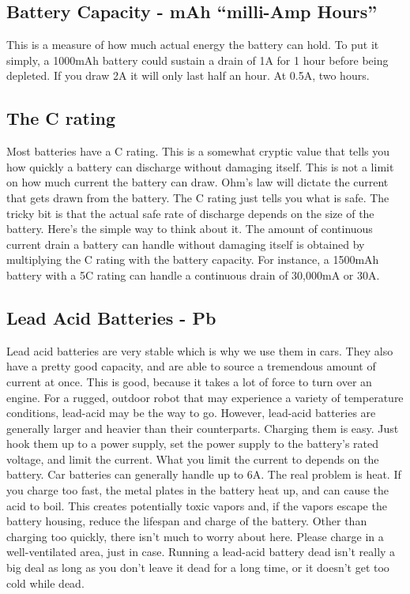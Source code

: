 \hypertarget{battery-capacity---mah-milli-amp-hours}{%
\subsection{Battery Capacity - mAh ``milli-Amp
Hours''}\label{battery-capacity---mah-milli-amp-hours}}

This is a measure of how much actual energy the battery can hold. To put
it simply, a 1000mAh battery could sustain a drain of 1A for 1 hour
before being depleted. If you draw 2A it will only last half an hour. At
0.5A, two hours.

\hypertarget{the-c-rating}{%
\subsection{The C rating}\label{the-c-rating}}

Most batteries have a C rating. This is a somewhat cryptic value that
tells you how quickly a battery can discharge without damaging itself.
This is not a limit on how much current the battery can draw. Ohm's law
will dictate the current that gets drawn from the battery. The C rating
just tells you what is safe. The tricky bit is that the actual safe rate
of discharge depends on the size of the battery. Here's the simple way
to think about it. The amount of continuous current drain a battery can
handle without damaging itself is obtained by multiplying the C rating
with the battery capacity. For instance, a 1500mAh battery with a 5C
rating can handle a continuous drain of 30,000mA or 30A.

\hypertarget{lead-acid-batteries---pb}{%
\subsection{Lead Acid Batteries - Pb}\label{lead-acid-batteries---pb}}

Lead acid batteries are very stable which is why we use them in cars.
They also have a pretty good capacity, and are able to source a
tremendous amount of current at once. This is good, because it takes a
lot of force to turn over an engine. For a rugged, outdoor robot that
may experience a variety of temperature conditions, lead-acid may be the
way to go. However, lead-acid batteries are generally larger and heavier
than their counterparts. Charging them is easy. Just hook them up to a
power supply, set the power supply to the battery's rated voltage, and
limit the current. What you limit the current to depends on the battery.
Car batteries can generally handle up to 6A. The real problem is heat.
If you charge too fast, the metal plates in the battery heat up, and can
cause the acid to boil. This creates potentially toxic vapors and, if
the vapors escape the battery housing, reduce the lifespan and charge of
the battery. Other than charging too quickly, there isn't much to worry
about here. Please charge in a well-ventilated area, just in case.
Running a lead-acid battery dead isn't really a big deal as long as you
don't leave it dead for a long time, or it doesn't get too cold while
dead.

